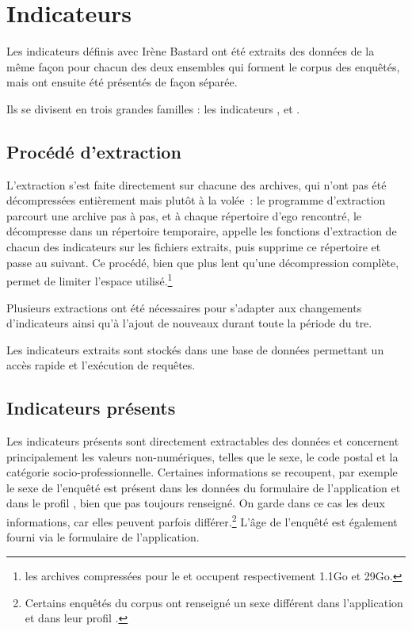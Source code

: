 
\section{Indicateurs}

Les indicateurs définis avec Irène Bastard ont été extraits des données de la
même façon pour chacun des deux ensembles qui forment le corpus des enquêtés,
mais ont ensuite été présentés de façon séparée.

Ils se divisent en trois grandes familles : les indicateurs ,
 et .

\subsection{Procédé d’extraction}

L’extraction s’est faite directement sur chacune des archives, qui n’ont pas
été décompressées entièrement mais plutôt à la volée~: le programme
d’extraction parcourt une archive pas à pas, et à chaque répertoire d’ego
rencontré, le décompresse dans un répertoire temporaire, appelle les fonctions
d’extraction de chacun des indicateurs sur les fichiers extraits, puis supprime
ce répertoire et passe au suivant. Ce procédé, bien que plus lent qu’une
décompression complète, permet de limiter l’espace utilisé.\footnote{les
archives compressées pour le \csa{} et \nocsa{} occupent respectivement 1.1Go et
29Go.}

Plusieurs extractions ont été nécessaires pour s’adapter aux changements
d’indicateurs ainsi qu’à l’ajout de nouveaux durant toute la période du {\sc
tre}.

Les indicateurs extraits sont stockés dans une base de données permettant un
accès rapide et l’exécution de requêtes.

\subsection{Indicateurs présents}

Les indicateurs présents sont directement extractables des données et
concernent principalement les valeurs non-numériques, telles que le sexe, le
code postal et la catégorie socio-professionnelle. Certaines informations se
recoupent, par exemple le sexe de l’enquêté est présent dans les données du
formulaire de l’application  et dans le profil \fb{}, bien
que pas toujours renseigné. On garde dans ce cas les deux informations, car
elles peuvent parfois différer.\footnote{Certains enquêtés du corpus ont
renseigné un sexe différent dans l’application  et dans leur profil
\fb{}.} L’âge de l’enquêté est également fourni via le formulaire de
l’application.

